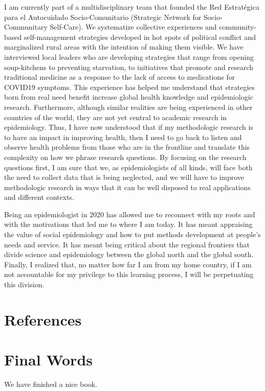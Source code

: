 \documentclass[
]{book}
\begin{document}
I am currently part of a multidisciplinary team that founded the Red Estratégica para el Autocuidado Socio-Comunitario (Strategic Network for Socio-Communitary Self-Care)\autocite{reas2020}. We systematize collective experiences and community-based self-management strategies developed in hot spots of political conflict\autocite{bjork-james2020} and marginalized rural areas with the intention of making them visible. We have interviewed local leaders who are developing strategies that range from opening soup-kitchens to preventing starvation, to initiatives that promote and research traditional medicine as a response to the lack of access to medications for COVID19 symptoms. This experience has helped me understand that strategies born from real need benefit increase global health knowledge and epidemiologic research. Furthermore, although similar realities are being experienced in other countries of the world, they are not yet central to academic research in epidemiology. Thus, I have now understood that if my methodologic research is to have an impact in improving health, then I need to go back to listen and observe health problems from those who are in the frontline and translate this complexity on how we phrase research questions. By focusing on the research questions first, I am sure that we, as epidemiologists of all kinds, will face both the need to collect data that is being neglected, and we will have to improve methodologic research in ways that it can be well disposed to real applications and different contexts.

Being an epidemiologist in 2020 has allowed me to reconnect with my roots and with the motivations that led me to where I am today. It has meant appraising the value of social epidemiology and how to put methods development at people's needs and service. It has meant being critical about the regional frontiers that divide science and epidemiology between the global north and the global south. Finally, I realized that, no matter how far I am from my home country, if I am not accountable for my privilege to this learning process, I will be perpetuating this division.

\hypertarget{chapter9}{%
\chapter{References}\label{chapter9}}

\hypertarget{chapter10}{%
\chapter{Final Words}\label{chapter10}}

We have finished a nice book.

\printbibliography
\end{document}
